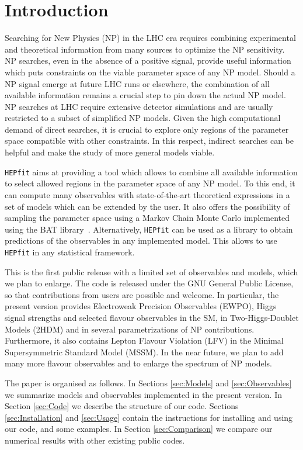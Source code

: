 \documentclass[preprint,3p,12pt]{elsarticle}
\newcommand{\HEPfit}{\texttt{HEPfit}\xspace}
\begin{document}
\section{Introduction}

Searching for New Physics (NP) in the LHC era requires combining
experimental and theoretical information from many sources to optimize
the NP sensitivity. NP searches, even in the absence of a positive
signal, provide useful information which puts constraints on the
viable parameter space of any NP model. Should a NP signal emerge at
future LHC runs or elsewhere, the combination of all available
information remains a crucial step to pin down the actual NP model.
NP searches at LHC require extensive detector simulations and are
usually restricted to a subset of simplified NP models. Given the high
computational demand of direct searches, it is crucial to explore only
regions of the parameter space compatible with other constraints. In
this respect, indirect searches can be helpful and make the study of
more general models viable.

\HEPfit aims at providing a tool which allows to combine all
available information to select allowed regions in the parameter space
of any NP model. To this end, it can compute many observables with
state-of-the-art theoretical expressions in a set of models which can
be extended by the user. It also offers the possibility of sampling
the parameter space using a Markov Chain Monte Carlo implemented using
the BAT library~\cite{arXiv:0808.2552}. Alternatively, \HEPfit can be
used as a library to obtain predictions of the observables in any
implemented model. This allows to use \HEPfit in any statistical
framework.

This is the first public release with a limited set of observables and
models, which we plan to enlarge. The code is released under the GNU
General Public License, so that contributions from users are possible
and welcome. In particular, the present version provides Electroweak
Precision Observables (EWPO), Higgs signal strengths and selected flavour observables in the SM, 
in Two-Higgs-Doublet Models (2HDM) and in several parametrizations
of NP contributions. Furthermore, it also contains Lepton Flavour Violation (LFV) in the Minimal Supersymmetric Standard Model (MSSM). In the near future, we plan to add many more flavour
observables and to enlarge the spectrum of NP models.

The paper is organised as follows. In Sections \ref{sec:Models} and \ref{sec:Observables} we
summarize models and observables implemented in the present
version. In Section \ref{sec:Code} we describe the structure of our
code. Sections \ref{sec:Installation} and \ref{sec:Usage} contain the instructions for installing and using our
code, and some examples. In Section \ref{sec:Comparison} we compare our
numerical results with other existing public codes.
\end{document}
